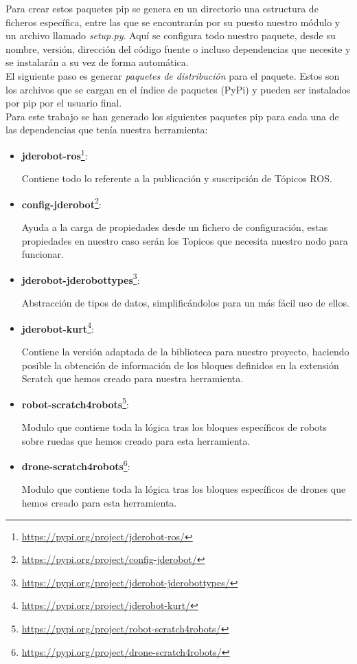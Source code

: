 Para crear estos paquetes pip se genera en un directorio una estructura de ficheros específica, entre las que se encontrarán por su puesto nuestro módulo y un archivo llamado \textit{setup.py}. Aquí se configura todo nuestro paquete, desde su nombre, versión, dirección del código fuente o incluso dependencias que necesite y se instalarán a su vez de forma automática.\\

El siguiente paso es generar \textit{paquetes de distribución} para el paquete. Estos son los archivos que se cargan en el índice de paquetes (PyPi) y pueden ser instalados por pip por el usuario final.\\

Para este trabajo se han generado los siguientes paquetes pip para cada una de las dependencias que tenía nuestra herramienta:

\begin{itemize}
\item \textbf{jderobot-ros}\footnote{\url{https://pypi.org/project/jderobot-ros/}}:

Contiene todo lo referente a la publicación y suscripción de Tópicos ROS. 
\item \textbf{config-jderobot}\footnote{\url{https://pypi.org/project/config-jderobot/}}:

Ayuda a la carga de propiedades desde un fichero de configuración, estas propiedades en nuestro caso serán los Topicos que necesita nuestro nodo para funcionar. 
\item \textbf{jderobot-jderobottypes}\footnote{\url{https://pypi.org/project/jderobot-jderobottypes/}}:

Abstracción de tipos de datos, simplificándolos para un más fácil uso de ellos.
\item \textbf{jderobot-kurt}\footnote{\url{https://pypi.org/project/jderobot-kurt/}}:

Contiene la versión adaptada de la biblioteca para nuestro proyecto, haciendo posible la obtención de información de los bloques definidos en la extensión Scratch que hemos creado para nuestra herramienta.
\item \textbf{robot-scratch4robots}\footnote{\url{https://pypi.org/project/robot-scratch4robots/}}:

Modulo que contiene toda la lógica tras los bloques específicos de robots sobre ruedas que hemos creado para esta herramienta.
\item \textbf{drone-scratch4robots}\footnote{\url{https://pypi.org/project/drone-scratch4robots/}}:

Modulo que contiene toda la lógica tras los bloques específicos de drones que hemos creado para esta herramienta.
\end{itemize}


